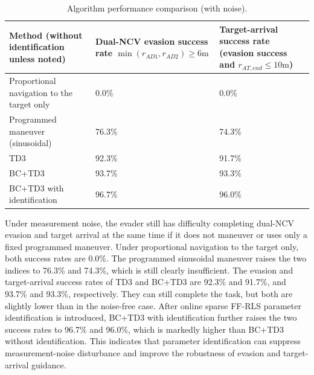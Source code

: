 \begin{table}[H]
\centering
\caption{Algorithm performance comparison (with noise).}
\label{tab:perf-noise}
\small
\begin{tabularx}{\linewidth}{lXX}
\toprule
Method (without identification unless noted) & Dual-NCV evasion success rate $\min ({r_{AD1}},{r_{AD2}}) \geqslant 6{\text{m}}$ & Target-arrival success rate (evasion success and ${r_{AT,end}} \leqslant 10{\text{m}}$) \\
\midrule
Proportional navigation to the target only & 0.0\% & 0.0\% \\
Programmed maneuver (sinusoidal) & 76.3\% & 74.3\% \\
TD3 & 92.3\% & 91.7\% \\
BC+TD3 & 93.7\% & 93.3\% \\
BC+TD3 with identification & 96.7\% & 96.0\% \\ %
\bottomrule
\end{tabularx}
\end{table}
Under measurement noise, the evader still has difficulty completing dual-NCV evasion and target arrival at the same time if it does not maneuver or uses only a fixed programmed maneuver. Under proportional navigation to the target only, both success rates are 0.0\%. The programmed sinusoidal maneuver raises the two indices to 76.3\% and 74.3\%, which is still clearly insufficient. The evasion and target-arrival success rates of TD3 and BC+TD3 are 92.3\% and 91.7\%, and 93.7\% and 93.3\%, respectively. They can still complete the task, but both are slightly lower than in the noise-free case. After online sparse FF-RLS parameter identification is introduced, BC+TD3 with identification further raises the two success rates to 96.7\% and 96.0\%, which is markedly higher than BC+TD3 without identification. This indicates that parameter identification can suppress measurement-noise disturbance and improve the robustness of evasion and target-arrival guidance.
